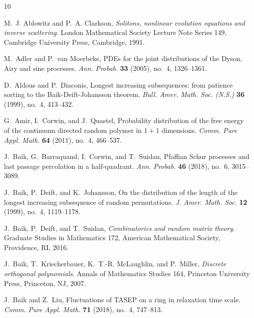 \documentclass[10pt]{article}
\theoremstyle{plain}
\theoremstyle{definition}
\numberwithin{equation}{section}
\begin{document}


\def\cydot{\leavevmode\raise.4ex\hbox{.}}
\begin{thebibliography}{10}
\providecommand{\url}[1]{\texttt{#1}}
\providecommand{\urlprefix}{URL }
\providecommand{\eprint}[2][]{\url{#2}}

M.~J. Ablowitz and P.~A. Clarkson, \emph{Solitons, nonlinear evolution
  equations and inverse scattering}. London Mathematical Society Lecture Note
  Series 149, Cambridge University Press, Cambridge, 1991.

M.~Adler and P.~van Moerbeke, P{DE}s for the joint distributions of the
  {D}yson, {A}iry and sine processes. \emph{Ann. Probab.} \textbf{33} (2005),
  no.~4, 1326--1361.

D.~Aldous and P.~Diaconis, Longest increasing subsequences: from patience
  sorting to the {B}aik-{D}eift-{J}ohansson theorem. \emph{Bull. Amer. Math.
  Soc. (N.S.)} \textbf{36} (1999), no.~4, 413--432.

G.~Amir, I.~Corwin, and J.~Quastel, Probability distribution of the free energy
  of the continuum directed random polymer in {$1+1$} dimensions. \emph{Comm.
  Pure Appl. Math.} \textbf{64} (2011), no.~4, 466--537.

J.~Baik, G.~Barraquand, I.~Corwin, and T.~Suidan, Pfaffian {S}chur processes
  and last passage percolation in a half-quadrant. \emph{Ann. Probab.}
  \textbf{46} (2018), no.~6, 3015--3089.

J.~Baik, P.~Deift, and K.~Johansson, On the distribution of the length of the
  longest increasing subsequence of random permutations. \emph{J. Amer. Math.
  Soc.} \textbf{12} (1999), no.~4, 1119--1178.

J.~Baik, P.~Deift, and T.~Suidan, \emph{Combinatorics and random matrix
  theory}. Graduate Studies in Mathematics 172, American Mathematical Society,
  Providence, RI, 2016.

J.~Baik, T.~Kriecherbauer, K.~T.-R. McLaughlin, and P.~Miller, \emph{Discrete
  orthogonal polynomials}. Annals of Mathematics Studies 164, Princeton
  University Press, Princeton, NJ, 2007.

J.~Baik and Z.~Liu, Fluctuations of {TASEP} on a ring in relaxation time scale.
  \emph{Comm. Pure Appl. Math.} \textbf{71} (2018), no.~4, 747--813.


\end{thebibliography}
\end{document}
